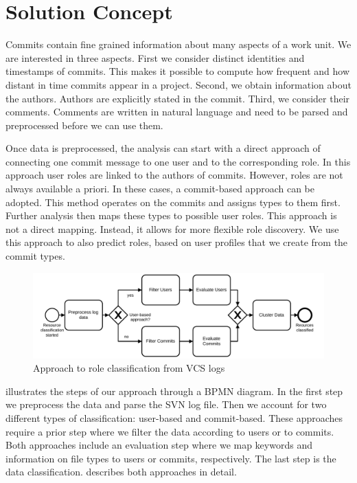 \section{Solution Concept}\label{sec:concept}


Commits contain fine grained information about many aspects of a work unit. We are interested in three aspects. First we consider distinct identities and timestamps of commits. This makes it possible to compute how frequent and how distant in time commits appear in a project. Second, we obtain information about the authors. Authors are explicitly stated in the commit. Third, we consider their comments. Comments are written in natural language and need to be parsed and preprocessed before we can use them.

Once data is preprocessed, the analysis can start with a direct approach of connecting one commit message to one user and to the corresponding role. In this approach user roles are linked to the authors of commits. However, roles are not always available a priori. In these cases, a commit-based approach can be adopted. This method operates on the commits and assigns types to them first. Further analysis then maps these types to possible user roles. This approach is not a direct mapping. Instead, it allows for more flexible role discovery. We use this approach to also predict roles, based on user profiles that we create from the commit types.

\begin{figure}[htb]
   \centering
   \includegraphics[width=1\linewidth]{ResourceClassification/figures/approach-bpmn}
   \caption[Approach to role classification from VCS logs]{Approach to role classification from VCS logs}
   \label{fig:approach-bpmn}
\end{figure}

 illustrates the steps of our approach through a BPMN diagram. In the first step we preprocess the data and parse the SVN log file. Then we account for two different types of classification: user-based and commit-based. These approaches require a prior step where we filter the data according to users or to commits. Both approaches include an evaluation step where we map keywords and information on file types to users or commits, respectively. The last step is the data classification.  describes both approaches in detail.
